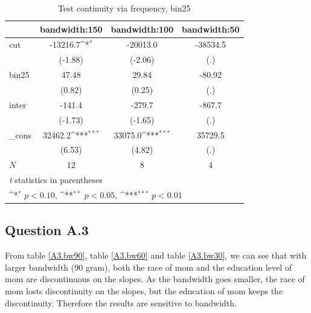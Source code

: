 \documentclass[a4paper,11pt]{article}
\begin{document}
\begin{table}[htbp]\centering
\def\sym#1{\ifmmode^{#1}\else\(^{#1}\)\fi}
\caption{Test continuity via frequency, bin25}
\label{A2.bin25}
\begin{tabular}{l*{3}{c}}
\hline\hline
            &\multicolumn{1}{c}{bandwidth:150}&\multicolumn{1}{c}{bandwidth:100}&\multicolumn{1}{c}{bandwidth:50}\\
\hline
cut         &    -13216.7\sym{*}  &    -20013.0         &    -38534.5         \\
            &     (-1.88)         &     (-2.06)         &         (.)         \\
[1em]
bin25       &       47.48         &       29.84         &      -80.92         \\
            &      (0.82)         &      (0.25)         &         (.)         \\
[1em]
inter       &      -141.4         &      -279.7         &      -867.7         \\
            &     (-1.73)         &     (-1.65)         &         (.)         \\
[1em]
\_cons      &     32462.2\sym{***}&     33075.0\sym{***}&     35729.5         \\
            &      (6.53)         &      (4.82)         &         (.)         \\
\hline
\(N\)       &          12         &           8         &           4         \\
\hline\hline
\multicolumn{4}{l}{\footnotesize \textit{t} statistics in parentheses}\\
\multicolumn{4}{l}{\footnotesize \sym{*} \(p<0.10\), \sym{**} \(p<0.05\), \sym{***} \(p<0.01\)}\\
\end{tabular}
\end{table}

\subsection*{Question A.3}

From table \ref{A3.bw90}, table \ref{A3.bw60} and table \ref{A3.bw30}, we can see that with larger bandwidth (90 gram), both the race of mom and the education level of mom are discontinuous on the slopes. As the bandwidth goes smaller, the race of mom losts discontinuity on the slopes, but the education of mom keeps the discontinuity. Therefore the results are sensitive to bandwidth.
\end{document}

